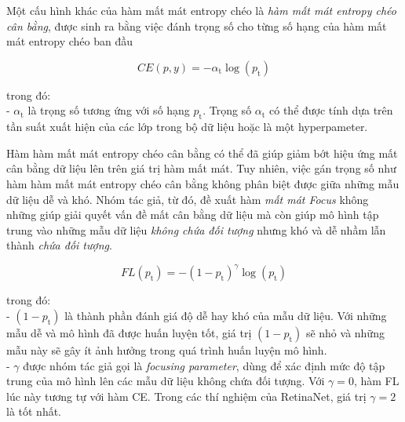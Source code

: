 {    \noindent
    Một cấu hình khác của hàm mất mát entropy chéo là \textit{hàm mất mát entropy chéo cân bằng}, được sinh ra bằng việc đánh trọng số cho từng số hạng của hàm mất mát entropy chéo ban đầu

    \begin{equation}
        CE(p,y) = - \alpha_\textrm{t} \log (p_\textrm{t})
    \end{equation}

    \noindent
    trong đó: \\
    - $\alpha_\textrm{t}$ là trọng số tương ứng với số hạng $p_\textrm{t}$.
    Trọng số $\alpha_\textrm{t}$ có thể được tính dựa trên tần suất xuất hiện của các lớp trong bộ dữ liệu hoặc là một hyperpameter.

    \noindent
    Hàm hàm mất mát entropy chéo cân bằng có thể đã giúp giảm bớt hiệu ứng mất cân bằng dữ liệu lên trên giá trị hàm mất mát.
    Tuy nhiên, việc gán trọng số như hàm hàm mất mát entropy chéo cân bằng không phân biệt được giữa những mẫu dữ liệu dễ và khó.
    Nhóm tác giả, từ đó, đề xuất hàm \textit{mất mát Focus} không những giúp giải quyết vấn đề mất cân bằng dữ liệu mà còn giúp mô hình tập trung vào những mẫu dữ liệu \textit{không chứa đối tượng} nhưng khó và dễ nhầm lẫn thành \textit{chứa đối tượng}.

    \begin{equation}
        FL(p_\textrm{t}) = - (1 - p_\textrm{t})^\gamma \log (p_\textrm{t})
    \end{equation}

    \noindent
    trong đó: \\
    - $(1 - p_\textrm{t})$ là thành phần đánh giá độ dễ hay khó của mẫu dữ liệu.
    Với những mẫu dễ và mô hình đã được huấn luyện tốt, giá trị $(1 - p_\textrm{t})$ sẽ nhỏ và những mẫu này sẽ gây ít ảnh hưởng trong quá trình huấn luyện mô hình. \\
    - $\gamma$ được nhóm tác giả gọi là \textit{focusing parameter}, dùng để xác định mức độ tập trung của mô hình lên các mẫu dữ liệu không chứa đối tượng.
    Với $\gamma = 0$, hàm FL lúc này tương tự với hàm CE.
    Trong các thí nghiệm của RetinaNet, giá trị $\gamma = 2$ là tốt nhất.

}
